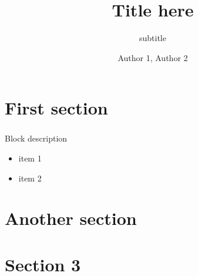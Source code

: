 \documentclass{beamer}
\title{Title here}
\subtitle{subtitle}
\author{Author 1, Author 2}
\begin{document}
\begin{frame}[plain]
  \titlepage
\end{frame}
 
\section{First section}
\begin{frame}
  \frametitle{\insertsection}
  \begin{block}{Block description}
    \begin{itemize}
     \item item 1
     \item item 2
    \end{itemize}   
  \end{block}
\end{frame}

\section{Another section}
\begin{frame}
  \frametitle{\insertsection}
\end{frame}

\section{Section 3}
\begin{frame}

\end{frame}
\end{document}
